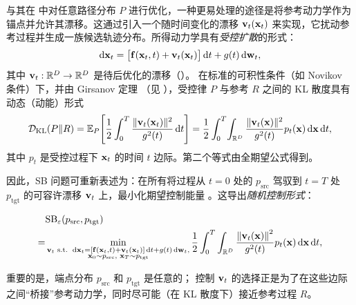 与其在  中对任意路径分布 $P$ 进行优化，一种更易处理的途径是将参考动力学作为锚点并允许其漂移。这通过引入一个随时间变化的漂移 ${\mathbf{v}}_t({\mathbf{x}}_t)$ 来实现，它扰动参考过程并生成一族候选轨迹分布。所得动力学具有\emph{受控扩散}的形式：
\[
    \mathop{}\!\mathrm{d} {\mathbf{x}}_t
    = \bigl[{\mathbf{f}}({\mathbf{x}}_t,t) + {\mathbf{v}}_t({\mathbf{x}}_t)\bigr]\mathop{}\!\mathrm{d} t + g(t) \mathop{}\!\mathrm{d} {\mathbf{w}}_t,
\]
其中 ${\mathbf{v}}_t:\mathbb{R}^D\to\mathbb{R}^D$ 是待后优化的漂移（）。 在标准的可积性条件（如 Novikov 条件）下，并由 Girsanov 定理
（见 ），受控律 $P$ 与参考 $R$ 之间的 KL 散度具有动态（动能）形式
\begin{align*}
    \mathcal{D}_{\mathrm{KL}}(P\|R)
    = \mathbb{E}_{P}\!\left[\frac{1}{2}\int_0^T \frac{\|{\mathbf{v}}_t({\mathbf{x}}_t)\|^2}{g^2(t)} \mathop{}\!\mathrm{d} t\right]
    = \frac{1}{2}\int_0^T\!\int_{\mathbb{R}^D}\frac{\|{\mathbf{v}}_t({\mathbf{x}})\|^2}{g^2(t)} p_t({\mathbf{x}}) \mathop{}\!\mathrm{d} {\mathbf{x}} \mathop{}\!\mathrm{d} t,
\end{align*}
其中 $p_t$ 是受控过程下 ${\mathbf{x}}_t$ 的时间 $t$ 边际。第二个等式由全期望公式得到。

因此，SB 问题可重新表述为：在所有将过程从 $t=0$ 处的 $p_{\mathrm{src}}$ 驾驭到 $t=T$ 处 $p_{\mathrm{tgt}}$ 的可容许漂移 ${\mathbf{v}}_t$ 上，最小化期望控制能量
\citep{dai1991stochastic,pra1990markov,pavon1991free,chen2016relation}。这导出\emph{随机控制形式}：
\begin{mdframed} 
\begin{align}\label{eq:sb-kinetic} 
\begin{aligned} &\mathrm{SB}_\varepsilon(p_{\mathrm{src}}, p_{\mathrm{tgt}}) \\= & \min_{\substack{ \mathbf{v}_t \text{ s.t. } \mathop{}\!\mathrm{d} {\mathbf{x}}_t = \left[{\mathbf{f}}({\mathbf{x}}_t, t) + \mathbf{v}_t({\mathbf{x}}_t) \right]\mathop{}\!\mathrm{d} t + g(t) \mathop{}\!\mathrm{d} {\mathbf{w}}_t, \\ {\mathbf{x}}_0 \sim p_{\mathrm{src}}, \,\, {\mathbf{x}}_T \sim p_{\mathrm{tgt}} }} \frac{1}{2} \int_0^T\int_{\mathbb{R}^D} \frac{\left\lVert{\mathbf{v}}_t({\mathbf{x}})\right\rVert^2}{g^2(t)} p_t({\mathbf{x}})\mathop{}\!\mathrm{d} {\mathbf{x}} \mathop{}\!\mathrm{d} t, 
\end{aligned}
\end{align} 
\end{mdframed}

重要的是，端点分布 $p_{\mathrm{src}}$ 和 $p_{\mathrm{tgt}}$ 是任意的；
控制 ${\mathbf{v}}_t$ 的选择正是为了在这些边际之间“桥接”参考动力学，同时尽可能（在 KL 散度下）接近参考过程 $R$。

